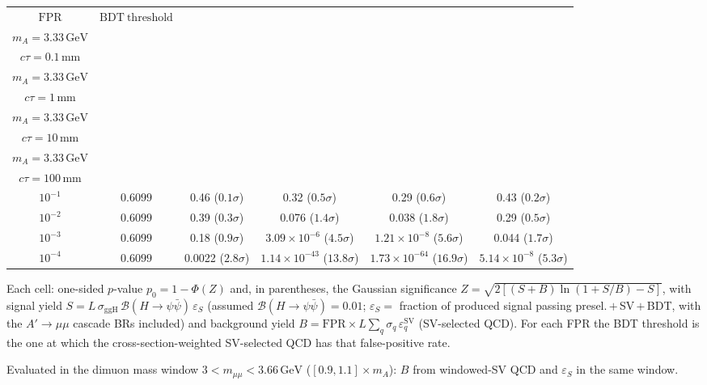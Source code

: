 \documentclass[10pt,a4paper]{article}
\begin{document}
{\begin{tabular}{cccccc}
\toprule
$\mathrm{FPR}$ & $\mathrm{BDT\ threshold}$ & \shortstack{$m_{\pi}=10\,\mathrm{GeV}$\\$m_{A}=3.33\,\mathrm{GeV}$\\$c\tau=0.1\,\mathrm{mm}$} & \shortstack{$m_{\pi}=10\,\mathrm{GeV}$\\$m_{A}=3.33\,\mathrm{GeV}$\\$c\tau=1\,\mathrm{mm}$} & \shortstack{$m_{\pi}=10\,\mathrm{GeV}$\\$m_{A}=3.33\,\mathrm{GeV}$\\$c\tau=10\,\mathrm{mm}$} & \shortstack{$m_{\pi}=10\,\mathrm{GeV}$\\$m_{A}=3.33\,\mathrm{GeV}$\\$c\tau=100\,\mathrm{mm}$} \\
\midrule
$10^{-1}$ & $0.6099$ & 0.46 ($0.1\sigma$) & 0.32 ($0.5\sigma$) & 0.29 ($0.6\sigma$) & 0.43 ($0.2\sigma$)\\
$10^{-2}$ & $0.6099$ & 0.39 ($0.3\sigma$) & 0.076 ($1.4\sigma$) & 0.038 ($1.8\sigma$) & 0.29 ($0.5\sigma$)\\
$10^{-3}$ & $0.6099$ & 0.18 ($0.9\sigma$) & $3.09\times10^{-6}$ ($4.5\sigma$) & $1.21\times10^{-8}$ ($5.6\sigma$) & 0.044 ($1.7\sigma$)\\
$10^{-4}$ & $0.6099$ & 0.0022 ($2.8\sigma$) & $1.14\times10^{-43}$ ($13.8\sigma$) & $1.73\times10^{-64}$ ($16.9\sigma$) & $5.14\times10^{-8}$ ($5.3\sigma$)\\
\bottomrule
\end{tabular}

{\small Each cell: one-sided $p$-value $p_0=1-\Phi(Z)$ and, in parentheses, the Gaussian significance $Z=\sqrt{2\left[(S{+}B)\ln(1{+}S/B)-S\right]}$, with signal yield $S=L\,\sigma_{\mathrm{ggH}}\,\mathcal{B}(H\to\psi\bar{\psi})\,\varepsilon_S$ (assumed $\mathcal{B}(H\to\psi\bar{\psi})=0.01$; $\varepsilon_S=$ fraction of produced signal passing presel.\,$+$\,SV\,$+$\,BDT, with the $A'\to\mu\mu$ cascade BRs included) and background yield $B=\mathrm{FPR}\times L\sum_q\sigma_q\,\varepsilon_q^{\mathrm{SV}}$ (SV-selected QCD). For each FPR the BDT threshold is the one at which the cross-section-weighted SV-selected QCD has that false-positive rate.}

{\small Evaluated in the dimuon mass window $3<m_{\mu\mu}<3.66\,\mathrm{GeV}$ ($[0.9,1.1]\times m_A$): $B$ from windowed-SV QCD and $\varepsilon_S$ in the same window.}

}\clearpage
\end{document}
